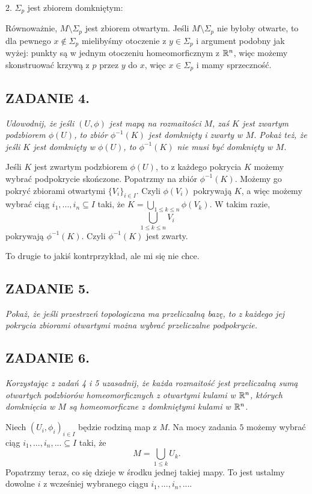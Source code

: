\documentclass{article}
\begin{document}
2. $\Sigma_p$ jest zbiorem domkniętym:

Równoważnie, $M\setminus\Sigma_p$ jest zbiorem otwartym. Jeśli $M\setminus\Sigma_p$ nie byłoby otwarte, to dla pewnego $x\notin\Sigma_p$ mielibyśmy otoczenie z $y\in \Sigma_p$ i argument podobny jak wyżej: punkty są w jednym otoczeniu homeomorficznym z $\mathbb{R}^n$, więc możemy skonstruować krzywą z $p$ przez $y$ do $x$, więc $x\in\Sigma_p$ i mamy sprzeczność.

\subsection*{ZADANIE 4.}
\emph{\color{pink}Udowodnij, że jeśli $(U,\phi)$ jest mapą na rozmaitości $M$, zaś $K$ jest zwartym podzbiorem $\phi(U)$, to zbiór $\phi^{-1}(K)$ jest domknięty i zwarty w $M$. Pokaż też, że jeśli $K$ jest domknięty w $\phi(U)$, to $\phi^{-1}(K)$ nie musi być domknięty w $M$.}
\medskip

Jeśli $K$ jest zwartym podzbiorem $\phi(U)$, to z każdego pokrycia $K$ możemy wybrać podpokrycie skończone. Popatrzmy na zbiór $\phi^{-1}(K)$. Możemy go pokryć zbiorami otwartymi $\{V_i\}_{i\in I}$. Czyli $\phi(V_i)$ pokrywają $K$, a więc możemy wybrać ciąg $i_1,...,i_n\subseteq I$ taki, że $K=\bigcup\limits_{1\leq k\leq n}\phi(V_k)$. W takim razie, 
$$\bigcup\limits_{1\leq k\leq n}V_i$$ 
pokrywają $\phi^{-1}(K)$. Czyli $\phi^{-1}(K)$ jest zwarty. 

To drugie to jakiś kontrprzykład, ale mi się nie chce.

\subsection*{ZADANIE 5.}
\emph{\color{yellow}Pokaż, że jeśli przestrzeń topologiczna ma przeliczalną bazę, to z każdego jej pokrycia zbiorami otwartymi można wybrać przeliczalne podpokrycie.}
\medskip

\subsection*{ZADANIE 6.}
\emph{\color{pink}Korzystając z zadań 4 i 5 uzasadnij, że każda rozmaitość jest przeliczalną sumą otwartych podzbiorów homeomorficznych z otwartymi kulami w $\mathbb{R}^n$, których domknięcia w $M$ są homeomorficzne z domkniętymi kulami w $\mathbb{R}^n$.}
\medskip

Niech $(U_i,\phi_i)_{i\in I}$ będzie rodziną map z $M$. Na mocy zadania $5$ możemy wybrać ciąg $i_1,...,i_n,...\subseteq I$ taki, że
$$M=\bigcup\limits_{1\leq k}U_k.$$
Popatrzmy teraz, co się dzieje w środku jednej takiej mapy. To jest ustalmy dowolne $i$ z wcześniej wybranego ciągu $i_1,...,i_n,...$. 
\end{document}
